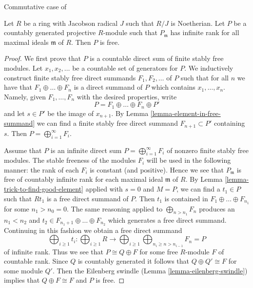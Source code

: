 \begin{theorem}
\label{theorem-countable-free}
\begin{reference}
Commutative case of \cite[Theorem 3.1]{Bass}
\end{reference}
Let $R$ be a ring with Jacobson radical $J$ such that $R/J$ is Noetherian.
Let $P$ be a countably generated projective $R$-module such that
$P_\mathfrak m$ has infinite rank for all maximal ideals
$\mathfrak m$ of $R$. Then $P$ is free.
\end{theorem}

\begin{proof}
We first prove that $P$ is a countable direct sum of finite stably
free modules. Let $x_1, x_2, \ldots$ be a countable set of generators for $P$.
We inductively construct finite stably free direct summands
$F_1, F_2, \ldots$ of $P$ such that for all $n$ we have
that $F_1 \oplus \ldots \oplus F_n$ is a direct summand of $P$
which contains $x_1, \ldots, x_n$. Namely, given $F_1, \ldots, F_n$
with the desired properties, write
$$
P = F_1 \oplus \ldots \oplus F_n \oplus P'
$$
and let $s \in P'$ be the image of $x_{n + 1}$.
By Lemma \ref{lemma-element-in-free-summand}
we can find a finite stably free direct summand $F_{n + 1} \subset P'$
containing $s$. Then $P = \bigoplus_{i = 1}^{\infty} F_i$.

\medskip\noindent
Assume that $P$ is an infinite direct sum
$P = \bigoplus_{i = 1}^{\infty} F_i$ of nonzero
finite stably free modules. The stable freeness
of the modules $F_i$ will be used in the following
manner: the rank of each $F_i$ is constant (and positive). Hence
we see that $P_\mathfrak m$ is free
of countably infinite rank for each maximal ideal
$\mathfrak m$ of $R$. By Lemma \ref{lemma-trick-to-find-good-element}
applied with $s = 0$ and $M = P$, we can find
a $t_1 \in P$ such that $Rt_1$ is a free direct summand of $P$.
Then $t_1$ is contained in $F_1 \oplus \ldots \oplus F_{n_1}$
for some $n_1 > n_0 = 0$.
The same reasoning applied to $\bigoplus_{n > n_1} F_n$
produces an $n_1 < n_2$ and $t_2 \in F_{n_1 + 1} \oplus \ldots \oplus F_{n_2}$
which generates a free direct summand.
Continuing in this fashion we obtain a free direct summand
$$
\bigoplus\nolimits_{i \geq 1} t_i :
\bigoplus\nolimits_{i \geq 1} R
\longrightarrow
\bigoplus\nolimits_{i \geq 1}
\bigoplus\nolimits_{n_i \geq n > n_{i - 1}} F_n = P
$$
of infinite rank. Thus we see that $P \cong Q \oplus F$ for some free
$R$-module $F$ of countable rank. Since $Q$ is countably
generated it follows that $Q \oplus Q' \cong F$ for
some module $Q'$. Then the Eilenberg swindle
(Lemma \ref{lemma-eilenberg-swindle}) implies that
$Q \oplus F \cong F$ and $P$ is free.
\end{proof}